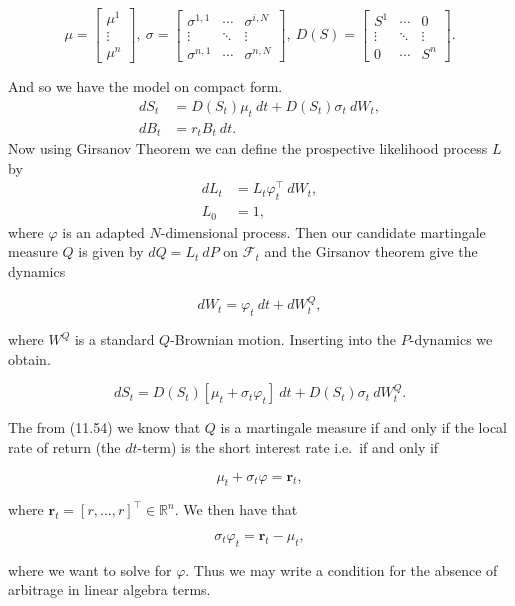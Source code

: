 \documentclass[a4paper,12pt,openany]{book}
\begin{document}
\[
\mu =
\begin{bmatrix}
\mu ^1\\
\vdots\\
\mu ^n
\end{bmatrix},\ \sigma=
\begin{bmatrix}
\sigma^{1,1}& \cdots & \sigma^{i,N}\\
\vdots & \ddots & \vdots\\
\sigma^{n,1}&\cdots&\sigma^{n,N}
\end{bmatrix},\ D(S)=
\begin{bmatrix}
S^{1}& \cdots & 0\\
\vdots & \ddots & \vdots\\
0&\cdots&S^n
\end{bmatrix}.
\]

And so we have the model on compact form.
\begin{align*}
dS_t&= D(S_t)\mu_t\ dt+D(S_t)\sigma_t\ dW_t,\tag{14.3}\\
dB_t&=r_tB_t\ dt.\tag{14.4}
\end{align*}
Now using Girsanov Theorem we can define the prospective likelihood process \(L\) by
\begin{align*}
dL_t&=L_t\varphi_t^\top\ dW_t,\tag{14.5}\\
L_0&=1,\tag{14.6}
\end{align*}
where \(\varphi\) is an adapted \(N\)-dimensional process. Then our candidate martingale measure \(Q\) is given by \(dQ=L_t\ dP\) on \(\mathcal{F}_t\) and the Girsanov theorem give the dynamics

\[
dW_t=\varphi_t\ dt+dW_t^Q,\tag{14.7}
\]

where \(W^Q\) is a standard \(Q\)-Brownian motion. Inserting into the \(P\)-dynamics we obtain.

\[
dS_t=D(S_t)[\mu_t+\sigma_t\varphi_t]\ dt+D(S_t)\sigma_t\ dW_t^Q.\tag{14.8}
\]

The from (11.54) we know that \(Q\) is a martingale measure if and only if the local rate of return (the \(dt\)-term) is the short interest rate i.e.~if and only if

\[
\mu_t+\sigma_t\varphi=\mathbf{r}_t,\tag{14.9}
\]

where \(\mathbf{r}_t=[r,...,r]^\top\in\mathbb{R}^n\). We then have that

\[
\sigma_t\varphi_t = \mathbf{r}_t-\mu_t,\tag{14.11}
\]

where we want to solve for \(\varphi\). Thus we may write a condition for the absence of arbitrage in linear algebra terms.
\end{document}
